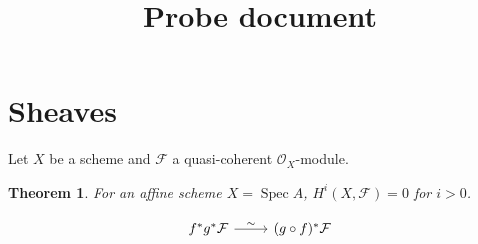\documentclass{amsart}
\newtheorem{theorem}{Theorem}
\begin{document}
\title{Probe document}
\maketitle
\section{Sheaves}
Let $X$ be a scheme and $\mathcal{F}$ a quasi-coherent $\mathcal{O}_X$-module.
\begin{theorem}
For an affine scheme $X=\operatorname{Spec}A$, $H^i(X,\mathcal F)=0$ for $i>0$.
\end{theorem}
\[
\begin{tikzcd}
f^*g^*\mathcal{F} \arrow[r,"\sim"] & (g\circ f)^*\mathcal{F}
\end{tikzcd}
\]
\lipsum[1-12]
\end{document}
